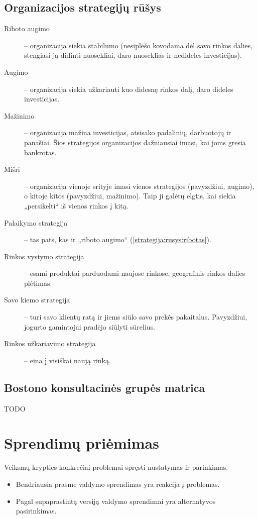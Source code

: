 \subsection{Organizacijos strategijų rūšys}

\begin{description}
  \item[Riboto augimo] \label{strategija:rusys:ribotas} – organizacija
    siekia stabilumo (nesiplėšo kovodama dėl savo rinkos dalies,
    stengiasi ją didinti nuosekliai, daro nuoseklias ir nedideles
    investicijas).
  \item[Augimo] – organizacija siekia užkariauti kuo didesnę rinkos
    dalį, daro dideles investicijas.
  \item[Mažinimo] – organizacija mažina investicijas, atsisako padalinių,
    darbuotojų ir panašiai. Šios strategijos organizacijos dažniausiai
    imasi, kai joms gresia bankrotas.
  \item[Mišri] – organizacija vienoje srityje imasi vienos strategijos
    (pavyzdžiui, augimo), o kitoje kitos (pavyzdžiui, mažinimo). Taip
    ji galėtų elgtis, kai siekia „persikelti“ iš vienos rinkos į kitą.
  \item[Palaikymo strategija] – tas pats, kas ir „riboto augimo“
    (\ref{strategija:rusys:ribotas}).
  \item[Rinkos vystymo strategija] – esami produktai parduodami naujose
    rinkose, geografinis rinkos dalies plėtimas.
  \item[Savo kiemo strategija] – turi savo klientų ratą ir jiems
    siūlo savo prekės pakaitalus. Pavyzdžiui, jogurto gamintojai
    pradėjo siūlyti sūrelius.
  \item[Rinkos užkariavimo strategija] – eina į visiškai naują rinką.
\end{description}

\subsection{Bostono konsultacinės grupės matrica}

TODO

\section{Sprendimų priėmimas}

\begin{defn}
  Veiksmų krypties konkrečiai problemai spręsti nustatymas ir parinkimas.
  \begin{itemize}
    \item Bendriausia prasme valdymo sprendimas yra reakcija į problemas.
    \item Pagal supaprastintą versiją valdymo sprendimai yra alternatyvos
      pasirinkimas.
  \end{itemize}
\end{defn}

